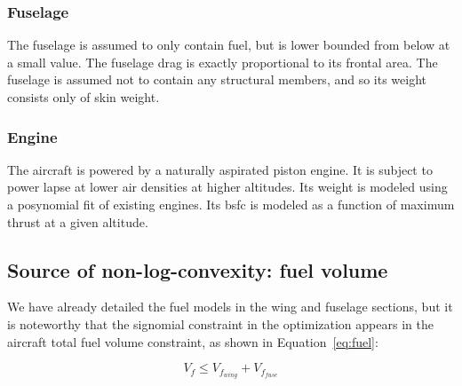 \subsubsection{Fuselage}

The fuselage is assumed to only contain fuel, but is lower bounded from below at a small value.
The fuselage drag is exactly proportional to its frontal area.
The fuselage is assumed not to contain any structural members, and so its weight consists only of skin weight.

\subsubsection{Engine}

The aircraft is powered by a naturally aspirated piston engine. It is subject to
power lapse at lower air densities at higher altitudes. Its weight is modeled using a posynomial fit of existing
engines. Its \gls{bsfc} is modeled as a function of maximum thrust at a given altitude.

\subsection{Source of non-log-convexity: fuel volume}
We have already detailed the fuel models in the wing and fuselage sections, but it is noteworthy that
the signomial constraint in the optimization appears in the aircraft total fuel volume constraint,
as shown in Equation~\ref{eq:fuel}:

\begin{equation}
\label{eq:fuel}
V_f \leq V_{f_{wing}} + V_{f_{fuse}} 
\end{equation}
